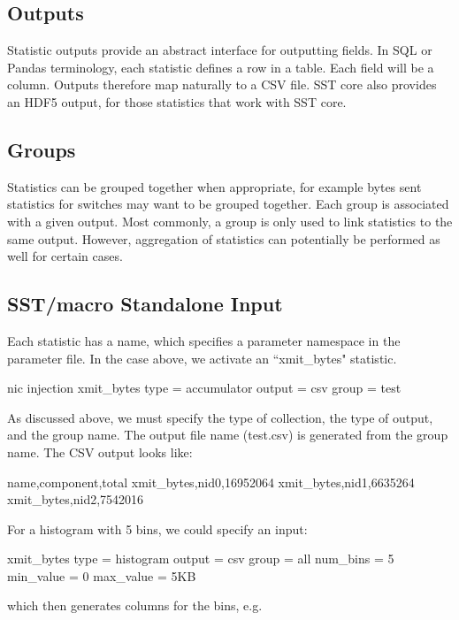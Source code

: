 \subsection{Outputs}
\label{subsec:outputs}

Statistic outputs provide an abstract interface for outputting fields.
In SQL or Pandas terminology, each statistic defines a row in a table. Each field will be a column.
Outputs therefore map naturally to a CSV file.
SST core also provides an HDF5 output, for those statistics that work with SST core.

\subsection{Groups}
\label{subsec:groups}

Statistics can be grouped together when appropriate, for example bytes sent statistics for switches may want to be grouped together.
Each group is associated with a given output.
Most commonly, a group is only used to link statistics to the same output.
However, aggregation of statistics can potentially be performed as well for certain cases.

\subsection{SST/macro Standalone Input}
Each statistic has a name, which specifies a parameter namespace in the parameter file.
In the case above, we activate an ``xmit\_bytes" statistic.

\begin{ViFile}
nic {
  injection {
   xmit_bytes {
     type = accumulator
     output = csv
     group = test
   }
  }
}
\end{ViFile}
As discussed above, we must specify the type of collection, the type of output, and the group name.
The output file name (test.csv) is generated from the group name. The CSV output looks like:

\begin{ViFile}
name,component,total
xmit_bytes,nid0,16952064
xmit_bytes,nid1,6635264
xmit_bytes,nid2,7542016
\end{ViFile}
For a histogram with 5 bins, we could specify an input:

\begin{ViFile}
 xmit_bytes {
  type = histogram
  output = csv
  group = all
  num_bins = 5
  min_value = 0
  max_value = 5KB
}
\end{ViFile}
which then generates columns for the bins, e.g.

